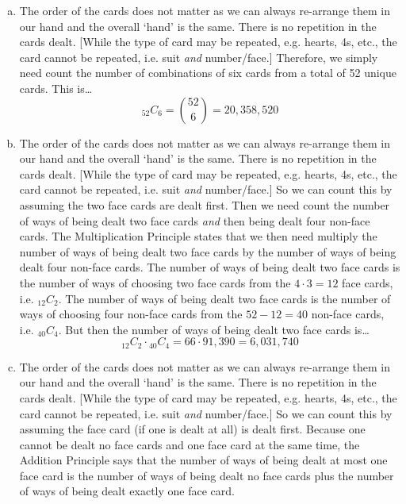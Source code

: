 \documentclass[11pt,letterpaper]{article}
\begin{document}
\sol 
\begin{enumerate}[(a)]
\item The order of the cards does not matter as we can always re-arrange them in our hand and the overall `hand' is the same. There is no repetition in the cards dealt. [While the type of card may be repeated, e.g. hearts, 4s, etc., the card cannot be repeated, i.e. suit \textit{and} number/face.] Therefore, we simply need count the number of combinations of six cards from a total of 52 unique cards. This is\dots
	\[
	_{52}C_6= \binom{52}{6}= 20,\!358,\!520
	\] \pspace

\item The order of the cards does not matter as we can always re-arrange them in our hand and the overall `hand' is the same. There is no repetition in the cards dealt. [While the type of card may be repeated, e.g. hearts, 4s, etc., the card cannot be repeated, i.e. suit \textit{and} number/face.] So we can count this by assuming the two face cards are dealt first. Then we need count the number of ways of being dealt two face cards \textit{and} then being dealt four non-face cards. The Multiplication Principle states that we then need multiply the number of ways of being dealt two face cards by the number of ways of being dealt four non-face cards. The number of ways of being dealt two face cards is the number of ways of choosing two face cards from the $4 \cdot 3= 12$ face cards, i.e. $_{12}C_2$. The number of ways of being dealt two face cards is the number of ways of choosing four non-face cards from the $52 - 12= 40$ non-face cards, i.e. $_{40}C_4$. But then the number of ways of being dealt two face cards is\dots
	\[
	_{12}C_2 \cdot {}_{40}C_4= 66 \cdot 91,\!390= 6,\!031,\!740
	\] \pspace

\item The order of the cards does not matter as we can always re-arrange them in our hand and the overall `hand' is the same. There is no repetition in the cards dealt. [While the type of card may be repeated, e.g. hearts, 4s, etc., the card cannot be repeated, i.e. suit \textit{and} number/face.] So we can count this by assuming the face card (if one is dealt at all) is dealt first. Because one cannot be dealt no face cards and one face card at the same time, the Addition Principle says that the number of ways of being dealt at most one face card is the number of ways of being dealt no face cards plus the number of ways of being dealt exactly one face card. 


\end{enumerate}
\end{document}
